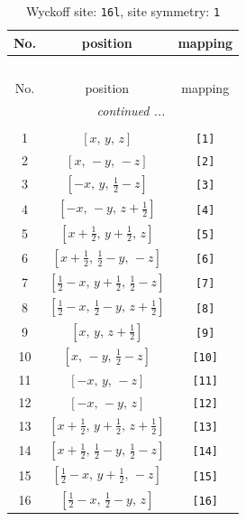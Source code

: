 \documentclass[fleqn,8pt]{jsarticle}
\begin{document}
\begin{longtable}{ccc}
\caption{Wyckoff site: {\tt 16l}, site symmetry: {\tt 1}}
 \\
 \hline \hline
No. & position & mapping \\ \hline \endfirsthead

\multicolumn{2}{l}{\tablename\ \thetable{}} \\
 \hline \hline
No. & position & mapping \\ \hline \endhead

 \hline \hline
\multicolumn{2}{r}{\footnotesize\it continued ...} \\ \endfoot

 \hline \hline
\multicolumn{2}{r}{} \\ \endlastfoot

1 & $\left[ x,\, y,\, z \right]$ & {\tt [1]} \\ \hline
2 & $\left[ x,\, - y,\, - z \right]$ & {\tt [2]} \\ \hline
3 & $\left[ - x,\, y,\, \frac{1}{2} - z \right]$ & {\tt [3]} \\ \hline
4 & $\left[ - x,\, - y,\, z + \frac{1}{2} \right]$ & {\tt [4]} \\ \hline
5 & $\left[ x + \frac{1}{2},\, y + \frac{1}{2},\, z \right]$ & {\tt [5]} \\ \hline
6 & $\left[ x + \frac{1}{2},\, \frac{1}{2} - y,\, - z \right]$ & {\tt [6]} \\ \hline
7 & $\left[ \frac{1}{2} - x,\, y + \frac{1}{2},\, \frac{1}{2} - z \right]$ & {\tt [7]} \\ \hline
8 & $\left[ \frac{1}{2} - x,\, \frac{1}{2} - y,\, z + \frac{1}{2} \right]$ & {\tt [8]} \\ \hline
9 & $\left[ x,\, y,\, z + \frac{1}{2} \right]$ & {\tt [9]} \\ \hline
10 & $\left[ x,\, - y,\, \frac{1}{2} - z \right]$ & {\tt [10]} \\ \hline
11 & $\left[ - x,\, y,\, - z \right]$ & {\tt [11]} \\ \hline
12 & $\left[ - x,\, - y,\, z \right]$ & {\tt [12]} \\ \hline
13 & $\left[ x + \frac{1}{2},\, y + \frac{1}{2},\, z + \frac{1}{2} \right]$ & {\tt [13]} \\ \hline
14 & $\left[ x + \frac{1}{2},\, \frac{1}{2} - y,\, \frac{1}{2} - z \right]$ & {\tt [14]} \\ \hline
15 & $\left[ \frac{1}{2} - x,\, y + \frac{1}{2},\, - z \right]$ & {\tt [15]} \\ \hline
16 & $\left[ \frac{1}{2} - x,\, \frac{1}{2} - y,\, z \right]$ & {\tt [16]} \\
\end{longtable}
\end{document}
